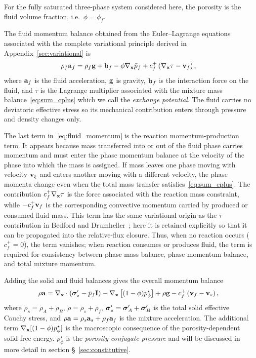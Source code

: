 \documentclass[11pt]{article}
\begin{document}
For the fully saturated three-phase system considered here, the porosity is the fluid volume fraction, i.e.\ $\phi = \phi_f$.  

The fluid momentum balance obtained from the Euler--Lagrange equations associated with the complete variational principle derived in Appendix~\ref{sec:variational} is
\begin{equation}
  \rho_f\mathbf{a}_f = \rho_f\mathbf{g} + \mathbf{b}_f - \phi\nabla_{\mathbf{x}}\bar p_f + c_f^+\left(\nabla_{\mathbf{x}}\tau-\mathbf{v}_f\right),
  \label{eq:fluid_momentum}
\end{equation}
where $\mathbf{a}_f$ is the fluid acceleration, $\mathbf{g}$ is gravity, $\mathbf{b}_f$ is the interaction force on the fluid, and $\tau$ is the Lagrange multiplier associated with the mixture mass balance~\eqref{eq:sum_cplus} which we call the \emph{exchange potential}.  The fluid carries no deviatoric effective stress so its mechanical contribution enters through pressure and density changes only.

The last term in~\eqref{eq:fluid_momentum} is the reaction momentum-production term.  It appears because mass transferred into or out of the fluid phase carries momentum and must enter the phase momentum balance at the velocity of the phase into which the mass is assigned.  If mass leaves one phase moving with velocity $\mathbf{v}_\xi$ and enters another moving with a different velocity, the phase momenta change even when the total mass transfer satisfies~\eqref{eq:sum_cplus}.  The contribution $c_f^+\nabla_{\mathbf{x}}\tau$ is the force associated with the reaction mass constraint, while $-c_f^+\mathbf{v}_f$ is the corresponding convective momentum carried by produced or consumed fluid mass.  This term has the same variational origin as the $\tau$ contribution in Bedford and Drumheller~\cite{drumheller1980thermomechanical}; here it is retained explicitly so that it can be propagated into the relative-flux closure.  Thus, when no reaction occurs ($c_f^+=0$), the term vanishes; when reaction consumes or produces fluid, the term is required for consistency between phase mass balance, phase momentum balance, and total mixture momentum.

Adding the solid and fluid balances gives the overall momentum balance
%
\begin{equation}
  \rho\mathbf{a} = \nabla_{\mathbf{x}}\cdot\left(\boldsymbol{\sigma}_s' - \bar p_f \mathbf{I}\right) - \nabla_{\mathbf{x}}\left[(1-\phi)p^\star_\phi\right] + \rho\mathbf{g} - c_f^+\left(\mathbf{v}_f-\mathbf{v}_s\right),
  \label{eq:overall_mom}
\end{equation}
%
where $\rho_s = \rho_A+\rho_B$, $\rho = \rho_s+\rho_f$, $\boldsymbol{\sigma}_s' = \boldsymbol{\sigma}_A'+\boldsymbol{\sigma}_B'$ is the total solid effective Cauchy stress, and $\rho\mathbf{a}=\rho_s\mathbf{a}_s+\rho_f\mathbf{a}_f$ is the mixture acceleration.  The additional term $\nabla_{\mathbf{x}}[(1-\phi)p^\star_\phi]$ is the macroscopic consequence of the porosity-dependent solid free energy. $p^\star_\phi$ is the \emph{porosity-conjugate pressure} and will be discussed in more detail in section \S~\ref{sec:constitutive}. 
\end{document}

